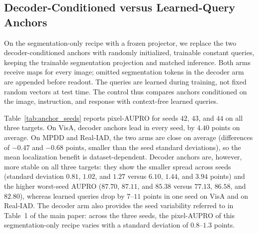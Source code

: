 \subsection{Decoder-Conditioned versus Learned-Query Anchors}
\label{app:anchors}
On the segmentation-only recipe with a frozen projector, we replace the two decoder-conditioned anchors with randomly initialized, trainable constant queries, keeping the trainable segmentation projection and matched inference. Both arms receive maps for every image; omitted segmentation tokens in the decoder arm are appended before readout. The queries are learned during training, not fixed random vectors at test time. The control thus compares anchors conditioned on the image, instruction, and response with context-free learned queries.

Table~\ref{tab:anchor_seeds} reports pixel-AUPRO for seeds $42$, $43$, and $44$ on all three targets. On VisA, decoder anchors lead in every seed, by $4.40$ points on average. On MPDD and Real-IAD, the two arms are close on average (differences of $-0.47$ and $-0.68$ points, smaller than the seed standard deviations), so the mean localization benefit is dataset-dependent. Decoder anchors are, however, more stable on all three targets: they show the smaller spread across seeds (standard deviation $0.81$, $1.02$, and $1.27$ versus $6.10$, $1.44$, and $3.94$ points) and the higher worst-seed AUPRO ($87.70$, $87.11$, and $85.38$ versus $77.13$, $86.58$, and $82.80$), whereas learned queries drop by $7$--$11$ points in one seed on VisA and on Real-IAD. The decoder arm also provides the seed variability referred to in Table~1 of the main paper: across the three seeds, the pixel-AUPRO of this segmentation-only recipe varies with a standard deviation of $0.8$--$1.3$ points.

